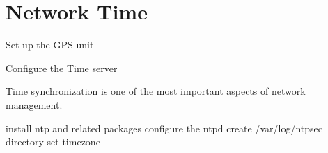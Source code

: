 \chapter{Network Time}

Set up the GPS unit


Configure the Time server



Time synchronization is one of the most important aspects of network management.

install ntp and related packages
configure the ntpd
create /var/log/ntpsec directory
set timezone